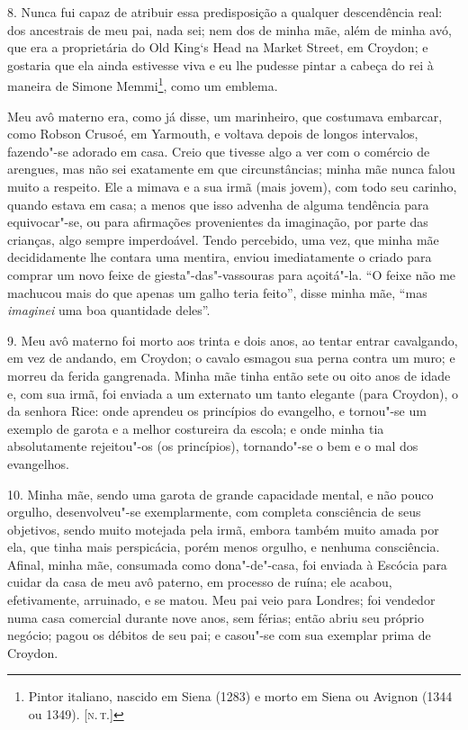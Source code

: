 8. Nunca fui capaz de atribuir essa predisposição a qualquer
descendência real: dos ancestrais de meu pai, nada sei; nem dos de minha
mãe, além de minha avó, que era a proprietária do Old King`s Head na
Market Street, em Croydon; e gostaria que ela ainda estivesse viva e eu
lhe pudesse pintar a cabeça do rei à maneira de Simone Memmi\footnote{Pintor
  italiano, nascido em Siena (1283) e morto em Siena ou Avignon (1344 ou
  1349). {[}\textsc{n.\,t.}{]}}, como um emblema.

Meu avô materno era, como já disse, um marinheiro, que costumava
embarcar, como Robson Crusoé, em Yarmouth, e voltava depois de longos
intervalos, fazendo"-se adorado em casa. Creio que tivesse algo a ver com
o comércio de arengues, mas não sei exatamente em que circunstâncias;
minha mãe nunca falou muito a respeito. Ele a mimava e a sua irmã (mais
jovem), com todo seu carinho, quando estava em casa; a menos que isso
advenha de alguma tendência para equivocar"-se, ou para afirmações
provenientes da imaginação, por parte das crianças, algo sempre
imperdoável. Tendo percebido, uma vez, que minha mãe decididamente lhe
contara uma mentira, enviou imediatamente o criado para comprar um novo
feixe de giesta"-das"-vassouras para açoitá"-la. ``O feixe não me machucou
mais do que apenas um galho teria feito'', disse minha mãe, ``mas
\emph{imaginei} uma boa quantidade deles''.

9. Meu avô materno foi morto aos trinta e dois anos, ao tentar entrar
cavalgando, em vez de andando, em Croydon; o cavalo esmagou sua perna
contra um muro; e morreu da ferida gangrenada. Minha mãe tinha então
sete ou oito anos de idade e, com sua irmã, foi enviada a um externato
um tanto elegante (para Croydon), o da senhora Rice: onde aprendeu os
princípios do evangelho, e tornou"-se um exemplo de garota e a melhor
costureira da escola; e onde minha tia absolutamente rejeitou"-os (os
princípios), tornando"-se o bem e o mal dos evangelhos.

10. Minha mãe, sendo uma garota de grande capacidade mental, e não pouco
orgulho, desenvolveu"-se exemplarmente, com completa consciência de seus
objetivos, sendo muito motejada pela irmã, embora também muito amada por
ela, que tinha mais perspicácia, porém menos orgulho, e nenhuma
consciência. Afinal, minha mãe, consumada como dona"-de"-casa, foi enviada
à Escócia para cuidar da casa de meu avô paterno, em processo de ruína;
ele acabou, efetivamente, arruinado, e se matou. Meu pai veio para
Londres; foi vendedor numa casa comercial durante nove anos, sem férias;
então abriu seu próprio negócio; pagou os débitos de seu pai; e casou"-se
com sua exemplar prima de Croydon.

